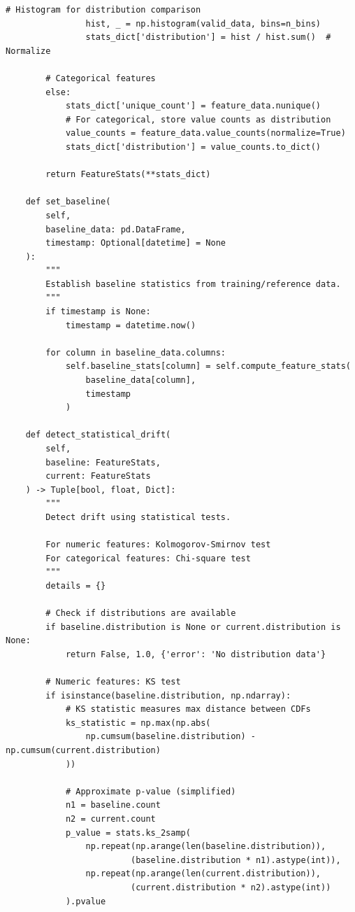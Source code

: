 \begin{lstlisting}[style=python, caption=Comprehensive feature monitoring and drift detection]
                # Histogram for distribution comparison
                hist, _ = np.histogram(valid_data, bins=n_bins)
                stats_dict['distribution'] = hist / hist.sum()  # Normalize

        # Categorical features
        else:
            stats_dict['unique_count'] = feature_data.nunique()
            # For categorical, store value counts as distribution
            value_counts = feature_data.value_counts(normalize=True)
            stats_dict['distribution'] = value_counts.to_dict()

        return FeatureStats(**stats_dict)

    def set_baseline(
        self,
        baseline_data: pd.DataFrame,
        timestamp: Optional[datetime] = None
    ):
        """
        Establish baseline statistics from training/reference data.
        """
        if timestamp is None:
            timestamp = datetime.now()

        for column in baseline_data.columns:
            self.baseline_stats[column] = self.compute_feature_stats(
                baseline_data[column],
                timestamp
            )

    def detect_statistical_drift(
        self,
        baseline: FeatureStats,
        current: FeatureStats
    ) -> Tuple[bool, float, Dict]:
        """
        Detect drift using statistical tests.

        For numeric features: Kolmogorov-Smirnov test
        For categorical features: Chi-square test
        """
        details = {}

        # Check if distributions are available
        if baseline.distribution is None or current.distribution is None:
            return False, 1.0, {'error': 'No distribution data'}

        # Numeric features: KS test
        if isinstance(baseline.distribution, np.ndarray):
            # KS statistic measures max distance between CDFs
            ks_statistic = np.max(np.abs(
                np.cumsum(baseline.distribution) - np.cumsum(current.distribution)
            ))

            # Approximate p-value (simplified)
            n1 = baseline.count
            n2 = current.count
            p_value = stats.ks_2samp(
                np.repeat(np.arange(len(baseline.distribution)),
                         (baseline.distribution * n1).astype(int)),
                np.repeat(np.arange(len(current.distribution)),
                         (current.distribution * n2).astype(int))
            ).pvalue


\end{lstlisting}
